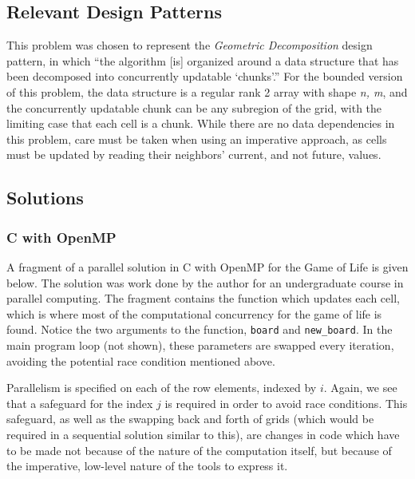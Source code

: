 \subsection{Relevant Design Patterns}
This problem was chosen to represent the \textit{Geometric Decomposition} design pattern, \cite{mass}
in which ``the algorithm [is] organized around a data structure that has been decomposed into concurrently updatable `chunks'.''
For the bounded version of this problem, 
the data structure is a regular rank 2 array with shape \textit{n, m}, 
and the concurrently updatable chunk can be any subregion of the grid, 
with the limiting case that each cell is a chunk. 
While there are no data dependencies in this problem, 
care must be taken when using an imperative approach, 
as cells must be updated by reading their neighbors' current, and not future, values.

\subsection{Solutions}
\subsubsection{C with OpenMP}
A fragment of a parallel solution in C with OpenMP for the Game of Life is given below. 
The solution was work done by the author for an undergraduate course in parallel computing.
The fragment contains the function which updates each cell, 
which is where most of the computational concurrency for the game of life is found. 
Notice the two arguments to the function, \texttt{board} and \texttt{new\_board}.
In the main program loop (not shown), these parameters are swapped every iteration, 
avoiding the potential race condition mentioned above.

\begin{singlespacing}
\begin{small}

\end{small}
\end{singlespacing}

Parallelism is specified on each of the row elements, indexed by $i$.
Again, we see that a safeguard for the index $j$ is required in order to avoid race conditions. 
This safeguard, as well as the swapping back and forth of grids (which would be required in a sequential solution similar to this), 
are changes in code which have to be made not because of the nature of the computation itself, 
but because of the imperative, low-level nature of the tools to express it.

